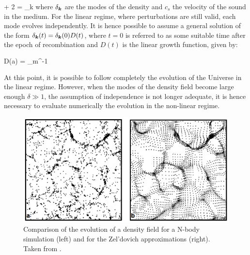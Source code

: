 \documentclass[a4,useAMS,usenatbib,usegraphicx,12pt]{article}
\begin{document}
{  + 2 =
\delta_{\bds k} }
where $\delta_{\boldsymbol{ k }}$ are the modes of the density and $c_s$ the velocity of 
the sound in the medium. For the linear regime, where perturbations are still
valid, each mode evolves independently. It is hence possible to assume a general
solution of the form $\delta_{\boldsymbol{ k }}(t) = \delta_{\boldsymbol{ k }}(0) D(t)$, where $t=0$ 
is referred to as some suitable time after the epoch of recombination and $D(t)$
is the linear growth function, given by:

{ D(a) = \Omega_m^{-1} }

At this point, it is possible to follow completely the evolution of the Universe
in the linear regime. However, when the modes of the density field become large
enough $\delta\gg 1$, the assumption of independence is not longer adequate, it 
is hence necessary to evaluate numerically the evolution in the non-linear 
regime.

\begin{figure}[h]
\centering

  \includegraphics[trim = 0mm 0mm 0mm 2mm, clip, keepaspectratio=true,
  width=0.4\textheight]{./figures/Zeldovich_Approximation.png}
  
  \caption{\small Comparison of the evolution of a density field for a 
  N-body simulation (left) and for the Zel'dovich approximations (right).
  Taken from \cite{longair2008}.}

  \label{fig:Friedmann}

\end{figure}
\end{document}
